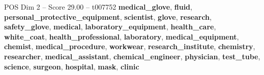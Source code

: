 \begin{textsample}{POS Dim 2 – Score 29.00 – t007752}  \label{ex:f2_pos_016}
\textbf{medical\_glove}, \textbf{fluid}, \textbf{personal\_protective\_equipment}, \textbf{scientist}, \textbf{glove}, \textbf{research}, \textbf{safety\_glove}, \textbf{medical}, \textbf{laboratory\_equipment}, \textbf{health\_care}, \textbf{white\_coat}, \textbf{health\_professional}, \textbf{laboratory}, \textbf{medical\_equipment}, \textbf{chemist}, \textbf{medical\_procedure}, \textbf{workwear}, \textbf{research\_institute}, \textbf{chemistry}, \textbf{researcher}, \textbf{medical\_assistant}, \textbf{chemical\_engineer}, \textbf{physician}, \textbf{test\_tube}, \textbf{science}, \textbf{surgeon}, \textbf{hospital}, \textbf{mask}, \textbf{clinic}

\end{textsample}
